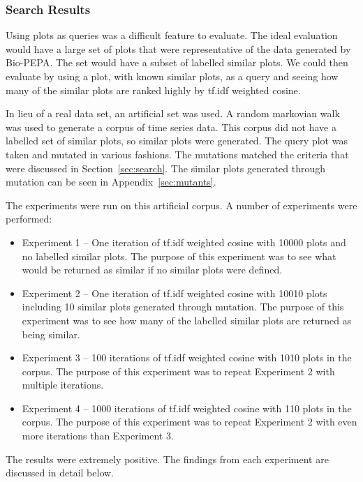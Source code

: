 \subsubsection{Search Results}
\label{sec:search_eval}

Using plots as queries was a difficult feature to evaluate.  The ideal evaluation would have a large set of plots that were representative of the data generated by Bio-PEPA.  The set would have a subset of labelled similar plots.  We could then evaluate by using a plot, with known similar plots, as a query and seeing how many of the similar plots are ranked highly by \ac{tf.idf} weighted cosine.

In lieu of a real data set, an artificial set was used.  A random markovian walk was used to generate a corpus of time series data.  This corpus did not have a labelled set of similar plots, so similar plots were generated.  The query plot was taken and mutated in various fashions.  The mutations matched the criteria that were discussed in Section~\ref{sec:search}.  The similar plots generated through mutation can be seen in Appendix~\ref{sec:mutants}.

The experiments were run on this artificial corpus.  A number of experiments were performed:
\begin{itemize}
\item Experiment 1 -- One iteration of \ac{tf.idf} weighted cosine with 10000 plots and no labelled similar plots.  The purpose of this experiment was to see what would be returned as similar if no similar plots were defined.
\item Experiment 2 -- One iteration of \ac{tf.idf} weighted cosine with 10010 plots including 10 similar plots generated through mutation.  The purpose of this experiment was to see how many of the labelled similar plots are returned as being similar.
\item Experiment 3 -- 100 iterations of \ac{tf.idf} weighted cosine with 1010 plots in the corpus.  The purpose of this experiment was to repeat Experiment 2 with multiple iterations.
\item Experiment 4 -- 1000 iterations of \ac{tf.idf} weighted cosine with 110 plots in the corpus.  The purpose of this experiment was to repeat Experiment 2 with even more iterations than Experiment 3.
\end{itemize}

The results were extremely positive.  The findings from each experiment are discussed in detail below.

